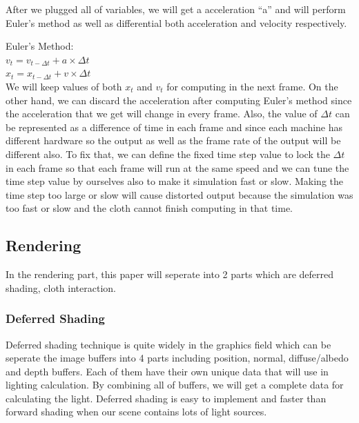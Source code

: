 \documentclass{article}
\begin{document}
\begin{multicols}{2}
\justifying
After we plugged all of variables, we will get a acceleration ``a'' and will perform Euler's method as well as differential both acceleration and velocity respectively.\newline

\raggedright Euler's Method:\\
\centering $v_{t} = v_{t-\Delta t} + a \times \Delta t$\\
\centering $x_{t} = x_{t-\Delta t} + v \times \Delta t$\\

\justifying
\indent We will keep values of both $x_t$ and $v_t$ for computing in the next frame. On the other hand, we can discard the acceleration after computing Euler's method since the acceleration that we get will change in every frame.
Also, the value of $\Delta t$ can be represented as a difference of time in each frame and since each machine has different hardware so the output as well as the frame rate of the output will be different also. To fix that, we can define the fixed time step value to lock the $\Delta t$ in each frame so that each frame will run at the same speed and we can tune the time step value by ourselves also to make it simulation fast or slow.
Making the time step too large or slow will cause distorted output because the simulation was too fast or slow and the cloth cannot finish computing in that time.
\subsection{Rendering}
In the rendering part, this paper will seperate into 2 parts which are deferred shading, cloth interaction.
\subsubsection{Deferred Shading}
Deferred shading technique is quite widely in the graphics field which can be seperate the image buffers into 4 parts including position, normal, diffuse/albedo and depth buffers. Each of them have their own unique data that will use in lighting calculation. By combining all of buffers, we will get a complete data for calculating the light. 
Deferred shading is easy to implement and faster than forward shading when our scene contains lots of light sources.\newline


\end{multicols}
\end{document}
